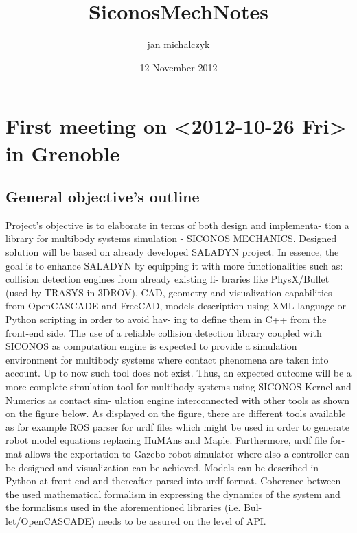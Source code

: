 \documentclass[11pt]{article}
\title{SiconosMechNotes}
\author{jan michalczyk}
\date{12 November 2012}
\begin{document}
\maketitle

\setcounter{tocdepth}{3}
\tableofcontents
\vspace*{1cm}

\section{First meeting on <2012-10-26 Fri> in Grenoble}
\label{sec-1}


\subsection{General objective's outline}
\label{sec-1.1}


   Project's objective is to elaborate in terms of both design and implementa-
   tion a library for multibody systems simulation - SICONOS MECHANICS.
   Designed solution will be based on already developed SALADYN project.
   In essence, the goal is to enhance SALADYN by equipping it with more
   functionalities such as: collision detection engines from already existing li-
   braries like PhysX/Bullet (used by TRASYS in 3DROV), CAD, geometry
   and visualization capabilities from OpenCASCADE and FreeCAD, models
   description using XML language or Python scripting in order to avoid hav-
   ing to define them in C++ from the front-end side. The use of a reliable
   collision detection library coupled with SICONOS as computation engine is
   expected to provide a simulation environment for multibody systems where
   contact phenomena are taken into account. Up to now such tool does not
   exist. Thus, an expected outcome will be a more complete simulation tool
   for multibody systems using SICONOS Kernel and Numerics as contact sim-
   ulation engine interconnected with other tools as shown on the figure below.
   As displayed on the figure, there are different tools available as for example
   ROS parser for urdf files which might be used in order to generate robot
   model equations replacing HuMAns and Maple. Furthermore, urdf file for-
   mat allows the exportation to Gazebo robot simulator where also a controller
   can be designed and visualization can be achieved. Models can be described
   in Python at front-end and thereafter parsed into urdf format. Coherence
   between the used mathematical formalism in expressing the dynamics of the
   system and the formalisms used in the aforementioned libraries (i.e. Bul-
   let/OpenCASCADE) needs to be assured on the level of API.
   
\end{document}
